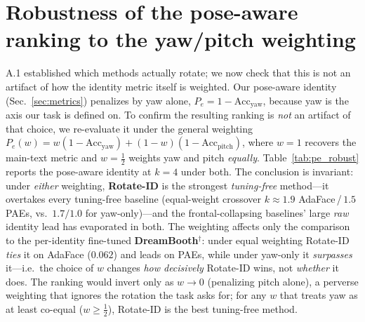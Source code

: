 \section{Robustness of the pose-aware ranking to the yaw/pitch weighting}
\label{sec:appendix_pe}
A.1 established which methods actually rotate; we now check that this is not
an artifact of how the identity metric itself is weighted. Our pose-aware
identity (Sec.~\ref{sec:metrics}) penalizes by yaw alone,
$P_e{=}1{-}\mathrm{Acc_{yaw}}$, because yaw is the axis our task is defined on. To
confirm the resulting ranking is \emph{not} an artifact of that choice, we
re-evaluate it under the general weighting
$P_e(w){=}w(1{-}\mathrm{Acc_{yaw}})+(1{-}w)(1{-}\mathrm{Acc_{pitch}})$, where
$w{=}1$ recovers the main-text metric and $w{=}\tfrac12$ weights yaw and pitch
\emph{equally}. Table~\ref{tab:pe_robust} reports the pose-aware identity at $k{=}4$
under both. The conclusion is invariant: under \emph{either} weighting,
\textbf{Rotate-ID} is the strongest \emph{tuning-free} method---it overtakes every
tuning-free baseline (equal-weight crossover $k{\approx}1.9$ AdaFace\,/\,$1.5$ PAEs,
vs.\ $1.7/1.0$ for yaw-only)---and the frontal-collapsing baselines' large
\emph{raw} identity lead has evaporated in both. The weighting affects only the
comparison to the per-identity fine-tuned \textbf{DreamBooth}$^\dagger$: under equal
weighting Rotate-ID \emph{ties} it on AdaFace ($0.062$) and leads on PAEs, while
under yaw-only it \emph{surpasses} it---i.e.\ the choice of $w$ changes \emph{how
decisively} Rotate-ID wins, not \emph{whether} it does. The ranking would invert
only as $w{\to}0$ (penalizing pitch alone), a perverse weighting that ignores the
rotation the task asks for; for any $w$ that treats yaw as at least co-equal
($w{\geq}\tfrac12$), Rotate-ID is the best tuning-free method.

